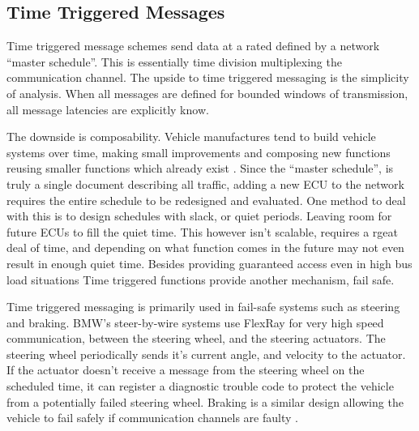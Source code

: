 \documentclass[conference,12pt]{IEEEtran}
\begin{document}
\subsection{Time Triggered Messages}
\label{sec:time_trigger}
Time triggered message schemes send data at a rated defined by a network
``master schedule''. This is essentially time division multiplexing the
communication channel. The upside to time triggered messaging is the simplicity
of analysis. When all messages are defined for bounded windows of transmission,
all message latencies are explicitly know.  

The downside is
composability. Vehicle manufactures tend to build vehicle systems over time,
making small improvements and composing new functions reusing smaller functions
which already exist \autocite{ludanek_improved_2006}. Since the ``master
schedule'', is truly a single document describing all traffic, adding a new ECU
to the network requires the entire schedule to be redesigned and evaluated. One
method to deal with this is to design schedules with slack, or quiet periods.
Leaving room for future ECUs to fill the quiet time. This however isn't
scalable, requires a rgeat deal of time, and depending on what function comes in
the future may not even result in enough quiet time. Besides providing
guaranteed access even in high bus load situations Time triggered functions
provide another mechanism, fail safe. 

Time triggered messaging is primarily used in fail-safe systems such as steering
and braking. BMW's steer-by-wire systems use FlexRay for very high speed
communication, between the steering wheel, and the steering actuators. The
steering wheel periodically sends it's current angle, and velocity to the
actuator. If the actuator doesn't receive a message from the steering wheel on
the scheduled time, it can register a diagnostic trouble code to protect the vehicle
from a potentially failed steering wheel.  Braking is a similar design allowing
the vehicle to fail safely if communication channels are faulty
\autocite{wang_high_2011}. 
\end{document}
